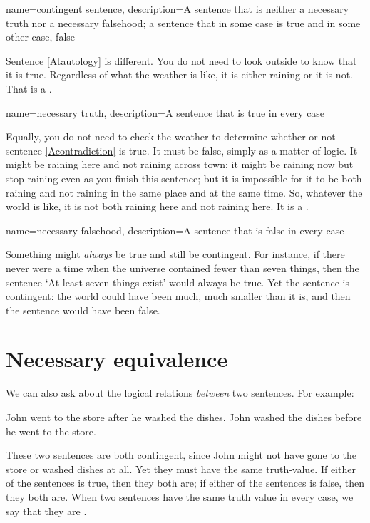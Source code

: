 {
name=contingent sentence,
description={A sentence that is neither a \gls{necessary truth} nor a \gls{necessary falsehood}; a sentence that in some case is true and in some other case, false}
}

Sentence \ref{Atautology} is different. You do not need to look outside to know that it is true. Regardless of what the weather is like, it is either raining or it is not. That is a . 

{
name={necessary truth},
description={A sentence that is true in every case}
}

Equally, you do not need to check the weather to determine whether or not sentence \ref{Acontradiction} is true. It must be false, simply as a matter of logic. It might be raining here and not raining across town; it might be raining now but stop raining even as you finish this sentence; but it is impossible for it to be both raining and not raining in the same place and at the same time. So, whatever the world is like, it is not both raining here and not raining here. It is a .

{
name={necessary falsehood},
description={A sentence that is false in every case}
}

Something might \emph{always} be true and still be contingent. For instance, if there never were a time when the universe contained fewer than seven things, then the sentence `At least seven things exist' would always be true. Yet the sentence is contingent: the world could have been much, much smaller than it is, and then the sentence would have been false. 

\section{Necessary equivalence}

We can also ask about the logical relations \emph{between} two sentences. For example:
\begin{earg}
\prem John went to the store after he washed the dishes.
\prem John washed the dishes before he went to the store.
\end{earg}
These two sentences are both contingent, since John might not have gone to the store or washed dishes at all. Yet they must have the same truth-value. If either of the sentences is true, then they both are; if either of the sentences is false, then they both are. When two sentences have the same truth value in every case, we say that they are .

